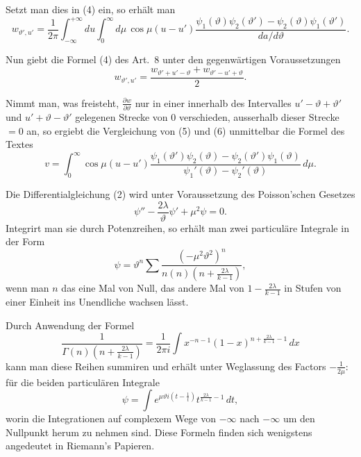 \documentclass[12pt,a4paper]{book}
\theoremstyle{definition}
\theoremstyle{remark}
\begin{document}
Setzt man dies in (4) ein, so erh\"alt man
\begin{equation*}
w_{\vartheta',u'} = \frac{1}{2\pi}\int_{-\infty}^{+\infty}du\int_{0}^{\infty}d\mu\,\cos\mu(u - u')\frac{\psi_{1}(\vartheta)\psi_{2}(\vartheta') - \psi_{2}(\vartheta)\psi_{1}(\vartheta')}{da/d\vartheta}.\tag{5}
\end{equation*}

Nun giebt die Formel (4) des Art.~8 unter den gegenw\"artigen Voraussetzungen
\begin{equation*}
w_{\vartheta',u'} = \frac{w_{\vartheta'+u'-\vartheta} + w_{\vartheta'-u'+\vartheta}}{2}.\tag{6}
\end{equation*}

Nimmt man, was freisteht, $\frac{\partial w}{\partial\vartheta}$ nur in einer innerhalb des Intervalles $u' - \vartheta + \vartheta'$ und $u' + \vartheta - \vartheta'$ gelegenen Strecke von $0$ verschieden, ausserhalb dieser Strecke $= 0$ an, so ergiebt die Vergleichung von (5) und (6) unmittelbar die Formel des Textes
\[
v = \int_{0}^{\infty}\cos\mu(u - u')\frac{\psi_{1}(\vartheta')\psi_{2}(\vartheta) - \psi_{2}(\vartheta')\psi_{1}(\vartheta)}{\psi_{1}'(\vartheta) - \psi_{2}'(\vartheta)}\,d\mu.
\]

Die Differentialgleichung (2) wird unter Voraussetzung des Poisson'schen Gesetzes
\[
\psi'' - \frac{2\lambda}{\vartheta}\psi' + \mu^{2}\psi = 0.
\]
Integrirt man sie durch Potenzreihen, so erh\"alt man zwei particul\"are Integrale in der Form
\[
\psi = \vartheta^{n}\sum\frac{(-\mu^{2}\vartheta^{2})^{n}}{n(n)(n + \frac{2\lambda}{k-1})},
\]
wenn man $n$ das eine Mal von Null, das andere Mal von $1 - \frac{2\lambda}{k-1}$ in Stufen von einer Einheit ins Unendliche wachsen l\"asst.

Durch Anwendung der Formel
\[
\frac{1}{\Gamma(n)(n + \frac{2\lambda}{k-1})} = \frac{1}{2\pi i}\int x^{-n-1}(1 - x)^{n + \frac{2\lambda}{k-1} - 1}\,dx
\]
kann man diese Reihen summiren und erh\"alt unter Weglassung des Factors $-\frac{1}{2\mu}$: f\"ur die beiden particul\"aren Integrale
\[
\psi = \int e^{\mu\vartheta i(t - \frac{1}{t})}t^{\frac{2\lambda}{k-1} - 1}\,dt,
\]
worin die Integrationen auf complexem Wege von $-\infty$ nach $-\infty$ um den Nullpunkt herum zu nehmen sind. Diese Formeln finden sich wenigstens angedeutet in Riemann's Papieren.
\end{document}
